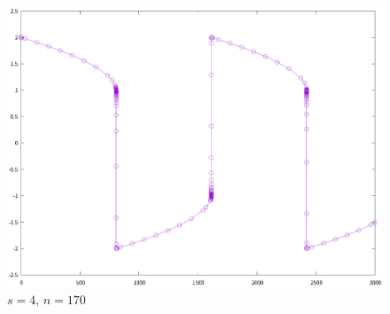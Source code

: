 \documentclass[9pt]{beamer}
\begin{document}
\begin{frame}
\begin{figure}[H]
\begin{minipage}[t]{0.32\linewidth}
      \caption{\small $s=3$, $n=200$}
  \end{minipage}
  \begin{minipage}[t]{0.32\linewidth}
      \centering
      \includegraphics[width=0.95\linewidth]{pic/9-8.eps}
      \vspace{-1em}
      \caption{\small $s=4$, $n=170$}
  \end{minipage}
\end{figure}

\end{frame}
\end{document}

